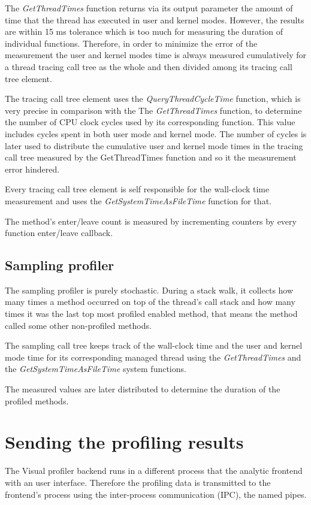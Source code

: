 The \textit{GetThreadTimes} function returns via its output parameter the amount of time that the thread has executed in user and kernel modes. However, the results are within 15 ms tolerance which is too much for measuring the duration of individual functions. Therefore, in order to minimize the error of the measurement the user and kernel modes time is always measured cumulatively for a thread tracing call tree as the whole and then divided among its tracing call tree element. 

The tracing call tree element uses the \textit{QueryThreadCycleTime} function, which is very precise in comparison with the The \textit{GetThreadTimes} function, to determine the number of CPU clock cycles used by its corresponding function. This value includes cycles spent in both user mode and kernel mode. The number of cycles is later used to distribute the cumulative user and kernel mode times in the tracing call tree measured by the GetThreadTimes function and so it the measurement error hindered.

Every tracing call tree element is self responsible for the wall-clock time measurement and uses the \textit{GetSystemTimeAsFileTime} function for that.

The method's enter/leave count is measured by incrementing counters by every function enter/leave callback.

\subsection{Sampling profiler}
The sampling profiler is purely stochastic. During a stack walk, it collects how many times a method occurred on top of the thread's call stack and how many times it was the last top most profiled enabled method, that means the method called some other non-profiled methods.

The sampling call tree keeps track of the wall-clock time and the user and kernel mode time for its corresponding managed thread using the \textit{GetThreadTimes} and the \textit{GetSystemTimeAsFileTime} system functions.

The measured values are later distributed to determine the duration of the profiled methods.

\section{Sending the profiling results}
The Visual profiler backend runs in a different process that the analytic frontend with an user interface. Therefore the profiling data is transmitted to the frontend's process using the inter-process communication (IPC), the named pipes. 

